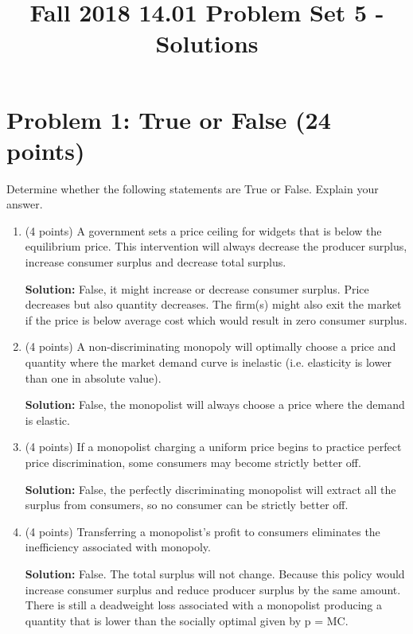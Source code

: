 \documentclass{article}
\begin{document}
\title{Fall 2018 14.01 Problem Set 5 -  Solutions}
\maketitle

\section*{Problem 1: True or False (24 points)}
Determine whether the following statements are True or False. Explain your answer.

\begin{enumerate}
\item (4 points) A government sets a price ceiling for widgets that is below the equilibrium price. This intervention will always decrease the producer surplus, increase consumer surplus and decrease total surplus.

\textbf{Solution:} False, it might increase or decrease consumer surplus. Price decreases but also quantity decreases. The firm(s) might also exit the market if the price is below average cost which would result in zero consumer surplus.

\item (4 points) A non-discriminating monopoly will optimally choose a price and quantity where the market demand curve is inelastic (i.e. elasticity is lower than one in absolute value).

\textbf{Solution:} False, the monopolist will always choose a price where the demand is elastic.

\item (4 points) If a monopolist charging a uniform price begins to practice perfect price discrimination, some consumers may become strictly better off.

\textbf{Solution:} False, the perfectly discriminating monopolist will extract all the surplus from consumers, so no consumer can be strictly better off.

\item (4 points) Transferring a monopolist’s profit to consumers eliminates the inefficiency associated with monopoly.

\textbf{Solution:} False. The total surplus will not change. Because this policy would increase consumer surplus and reduce producer surplus by the same amount. There is still a deadweight loss associated with a monopolist producing a quantity that is lower than the socially optimal given by p = MC.


\end{enumerate}
\end{document}
